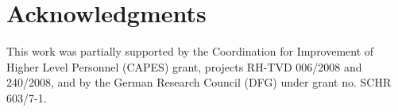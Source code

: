 \documentclass[conference]{IEEEtran}
\begin{document}
\section{Acknowledgments}
This work was partially supported by the Coordination for Improvement of Higher Level Personnel (CAPES) grant, projects RH-TVD 006/2008 and 240/2008, and by the German Research Council (DFG) under grant no. SCHR 603/7-1.




\end{document}
